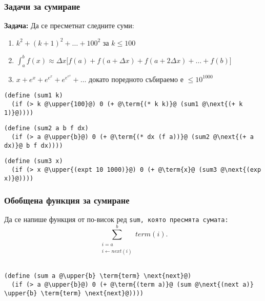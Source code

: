 \documentclass{beamer}
\begin{document}
\begin{frame}[fragile]
  \frametitle{Задачи за сумиране}

  \textbf{Задача:} Да се пресметнат следните суми:
  \begin{enumerate}
  \item $k^2 + (k+1)^2 + \ldots + 100^2$ за $k \leq 100$
  \item $\int_a^b f(x) \approx \Delta x\big[f(a) + f(a+\Delta x) + f(a+2\Delta x) + \ldots + f(b)\big]$
  \item $x + e^x + e^{e^x} + e^{e^{e^x}} + \ldots$ докато поредното събираемо е $\leq 10^{1000}$
  \end{enumerate}
  \pause
  \newcommand{\upper}{\textcolor<5->{red}}
  \newcommand{\term}{\textcolor<6->{green}}
  \newcommand{\next}{\textcolor<7->{blue}}
\begin{lstlisting}
(define (sum1 k)
  (if (> k @\upper{100}@) 0 (+ @\term{(* k k)}@ (sum1 @\next{(+ k 1)}@))))
\end{lstlisting}
  \pause
\begin{lstlisting}
(define (sum2 a b f dx)
  (if (> a @\upper{b}@) 0 (+ @\term{(* dx (f a))}@ (sum2 @\next{(+ a dx)}@ b f dx))))
\end{lstlisting}
  \pause
\begin{lstlisting}
(define (sum3 x)
  (if (> x @\upper{(expt 10 1000)}@) 0 (+ @\term{x}@ (sum3 @\next{(exp x)}@))))
\end{lstlisting}

\end{frame}

\begin{frame}[fragile]
  \frametitle{Обобщена функция за сумиране}
  Да се напише функция от по-висок ред \tt{sum}, която пресмята сумата:
  \begin{equation*}
    \sum_{\substack{i=a \\i \leftarrow next(i)}}^b term(i).
  \end{equation*}
  \pause
  \newcommand{\upper}{\textcolor{red}}
  \newcommand{\term}{\textcolor{green}}
  \newcommand{\next}{\textcolor{blue}}
\begin{lstlisting}
(define (sum a @\upper{b} \term{term} \next{next}@)
  (if (> a @\upper{b}@) 0 (+ @\term{(term a)}@ (sum @\next{(next a)} \upper{b} \term{term} \next{next}@))))
\end{lstlisting}
\end{frame}
\end{document}
